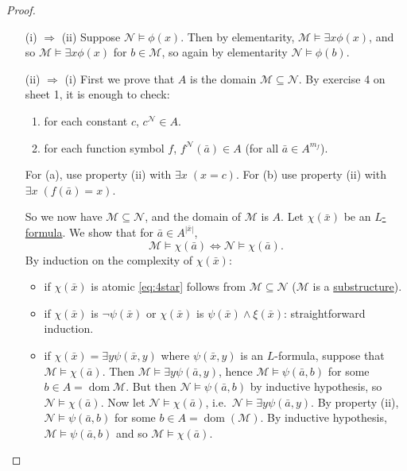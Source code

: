 \documentclass{article}
\let\models\vDash
\DeclareMathOperator{\dom}{dom}
\begin{document}
\begin{proof}\leavevmode
  \begin{itemize}
    \item [(i) $\Rightarrow$ (ii)] Suppose $\mathcal{N} \models \phi(x)$.
      Then by elementarity, $\mathcal{M} \models \exists x \phi(x)$, and so $\mathcal{M} \models \exists x \phi(x)$ for $b \in \mathcal{M}$, so again by elementarity $\mathcal{N} \models \phi(b)$.
    \item [(ii) $\Rightarrow$ (i)] First we prove that $A$ is the domain $\mathcal{M} \subseteq \mathcal{N}$.
      By exercise 4 on sheet 1, it is enough to check:
      \begin{enumerate}[label=(\alph*)]
        \item for each constant $c$, $c^\mathcal{N} \in A$.
        \item for each function symbol $f$, $f^{\mathcal{N}}(\bar{a}) \in A$ (for all $\bar{a} \in A^{m_f}$).
      \end{enumerate}
      For (a), use property (ii) with $\exists x\; (x = c)$. For (b) use property (ii) with $\exists x\; (f(\bar{a}) = x)$.

      So we now have $\mathcal{M} \subseteq \mathcal{N}$, and the domain of $\mathcal{M}$ is $A$.
      Let $\chi(\bar{x})$ be an \hyperlink{def:form}{$L$-formula}.
      We show that for $\bar{a} \in A^{|\bar{x}|}$,
      \begin{equation*}
        \mathcal{M} \models \chi(\bar{a}) \iff \mathcal{N} \models \chi(\bar{a}). \tag{$*$} \label{eq:4star}
      \end{equation*}
      By induction on the complexity of $\chi(\bar{x})$:
      \begin{itemize}[label=--]
        \item if $\chi(\bar{x})$ is atomic \eqref{eq:4star} follows from $\mathcal{M} \subseteq \mathcal{N}$ ($\mathcal{M}$ is a \hyperlink{def:subs}{substructure}).
        \item if $\chi(\bar{x})$ is $\neg \psi(\bar{x})$ or $\chi(\bar{x})$ is $\psi(\bar{x}) \wedge \xi(\bar{x})$: straightforward induction.
        \item if $\chi(\bar{x}) = \exists y \psi(\bar{x},y)$ where $\psi(\bar{x},y)$ is an $L$-formula, suppose that $\mathcal{M} \models \chi(\bar{a})$.
          Then $\mathcal{M} \models \exists y \psi(\bar{a}, y)$, hence $\mathcal{M} \models \psi(\bar{a},b)$ for some $b \in A = \dom \mathcal{M}$.
          But then $\mathcal{N} \models \psi(\bar{a},b)$ by inductive hypothesis, so $\mathcal{N} \models \chi(\bar{a})$.
          Now let $\mathcal{N} \models \chi(\bar{a})$, i.e.\ $\mathcal{N} \models \exists y \psi(\bar{a},y)$.
          By property (ii), $\mathcal{N} \models \psi(\bar{a},b)$ for some $b \in A = \dom(\mathcal{M})$.
          By inductive hypothesis, $\mathcal{M} \models \psi(\bar{a},b)$ and so $\mathcal{M} \models \chi(\bar{a})$. \qedhere
      \end{itemize}
  \end{itemize}
\end{proof}
\end{document}
